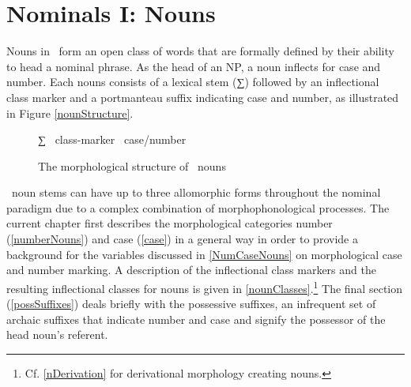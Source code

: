 


\chapter{Nominals I: Nouns}\label{nouns}
Nouns in \PS\ form an open class of words that are formally defined %
by their ability to head a nominal phrase. As the head of an NP, a noun inflects for case and number. 
Each nouns consists of a lexical stem (∑) followed by an inflectional class marker and a portmanteau suffix indicating case and number, as illustrated in Figure \vref{nounStructure}.
\begin{figure}[h]\centering
∑ \PLUS\ class-marker \PLUS\ case/number%
\caption{The morphological structure of \PS\ nouns}\label{nounStructure}
\end{figure}

\PS\ noun stems can have up to three allomorphic forms throughout the nominal paradigm due to a complex combination of morphophonological processes. 
The current chapter first describes the morphological categories number (\SEC\ref{numberNouns}) and case (\SEC\ref{case}) in a general way in order to provide a background for the variables discussed in \SEC\ref{NumCaseNouns} on morphological case and number marking. %
A description of the inflectional class markers and the resulting inflectional classes for nouns is given in \SEC\ref{nounClasses}.\footnote{Cf. \SEC\ref{nDerivation} for derivational morphology creating nouns.} %
The final section (\SEC\ref{possSuffixes}) deals briefly with the possessive suffixes, an infrequent set of archaic suffixes that indicate number and case and signify the possessor of the head noun’s referent. %

